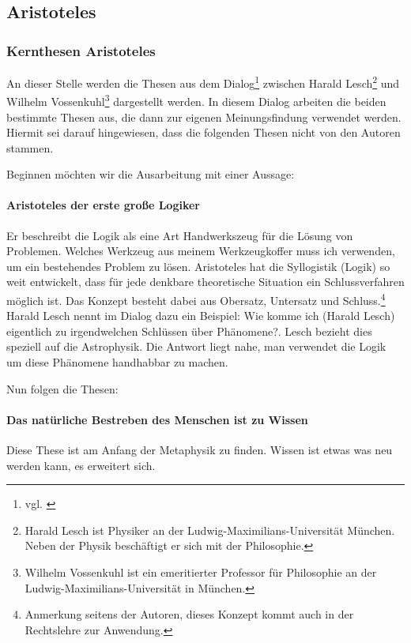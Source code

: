 \subsection{Aristoteles}

\subsubsection{Kernthesen Aristoteles}

An dieser Stelle werden die Thesen aus dem Dialog\footnote{vgl. \cite{Aristoteles3}} zwischen Harald Lesch\footnote{Harald Lesch ist Physiker an der Ludwig-Maximilians-Universität München. Neben der Physik beschäftigt er sich mit der Philosophie.} und Wilhelm Vossenkuhl\footnote{Wilhelm Vossenkuhl ist ein emeritierter Professor für Philosophie an der Ludwig-Maximilians-Universität in München.} dargestellt werden. In diesem Dialog arbeiten die beiden bestimmte Thesen aus, die dann zur eigenen Meinungsfindung verwendet werden. Hiermit sei darauf hingewiesen, dass die folgenden Thesen nicht von den Autoren stammen.

Beginnen möchten wir die Ausarbeitung mit einer Aussage:
\paragraph{\glqq Aristoteles der erste große Logiker\grqq}
Er beschreibt die Logik als eine Art Handwerkszeug für die Lösung von Problemen. Welches Werkzeug aus meinem Werkzeugkoffer muss ich verwenden, um ein bestehendes Problem zu lösen. Aristoteles hat die Syllogistik (Logik) so weit entwickelt, dass für jede denkbare theoretische Situation ein Schlussverfahren möglich ist. Das Konzept besteht dabei aus Obersatz, Untersatz und Schluss.\footnote{Anmerkung seitens der Autoren, dieses Konzept kommt auch in der Rechtslehre zur Anwendung.} Harald Lesch nennt im Dialog dazu ein Beispiel: \glqq Wie komme ich (Harald Lesch) eigentlich zu irgendwelchen Schlüssen über Phänomene?\grqq. Lesch bezieht dies speziell auf die Astrophysik. Die Antwort liegt nahe, man verwendet die Logik um diese Phänomene handhabbar zu machen.

Nun folgen die Thesen:
\paragraph{Das natürliche Bestreben des Menschen ist zu Wissen}
Diese These ist am Anfang der Metaphysik zu finden. Wissen ist etwas was neu werden kann, es erweitert sich.  

